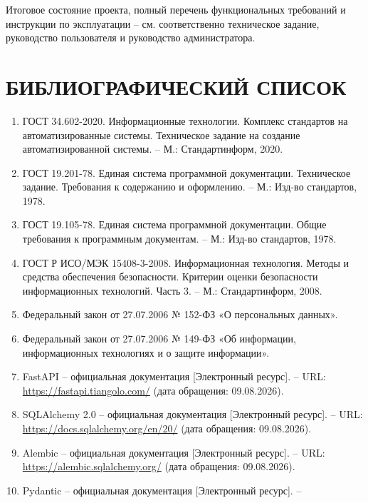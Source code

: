 Итоговое состояние проекта, полный перечень функциональных требований и
инструкции по эксплуатации -- см. соответственно техническое задание,
руководство пользователя и руководство администратора.

\section*{БИБЛИОГРАФИЧЕСКИЙ СПИСОК}

\begin{enumerate}
  \item ГОСТ 34.602-2020. Информационные технологии. Комплекс
        стандартов на автоматизированные системы. Техническое задание
        на создание автоматизированной системы. -- М.: Стандартинформ,
        2020.
  \item ГОСТ 19.201-78. Единая система программной документации.
        Техническое задание. Требования к содержанию и оформлению. --
        М.: Изд-во стандартов, 1978.
  \item ГОСТ 19.105-78. Единая система программной документации. Общие
        требования к программным документам. -- М.: Изд-во стандартов,
        1978.
  \item ГОСТ Р ИСО/МЭК 15408-3-2008. Информационная технология. Методы
        и средства обеспечения безопасности. Критерии оценки
        безопасности информационных технологий. Часть 3. -- М.:
        Стандартинформ, 2008.
  \item Федеральный закон от 27.07.2006 № 152-ФЗ «О персональных
        данных».
  \item Федеральный закон от 27.07.2006 № 149-ФЗ «Об информации,
        информационных технологиях и о защите информации».
  \item FastAPI -- официальная документация [Электронный ресурс]. --
        URL: \url{https://fastapi.tiangolo.com/} (дата обращения: 09.08.2026).
  \item SQLAlchemy 2.0 -- официальная документация [Электронный
        ресурс]. -- URL: \url{https://docs.sqlalchemy.org/en/20/} (дата
        обращения: 09.08.2026).
  \item Alembic -- официальная документация [Электронный ресурс]. --
        URL: \url{https://alembic.sqlalchemy.org/} (дата обращения:
        09.08.2026).
  \item Pydantic -- официальная документация [Электронный ресурс]. --

\end{enumerate}
